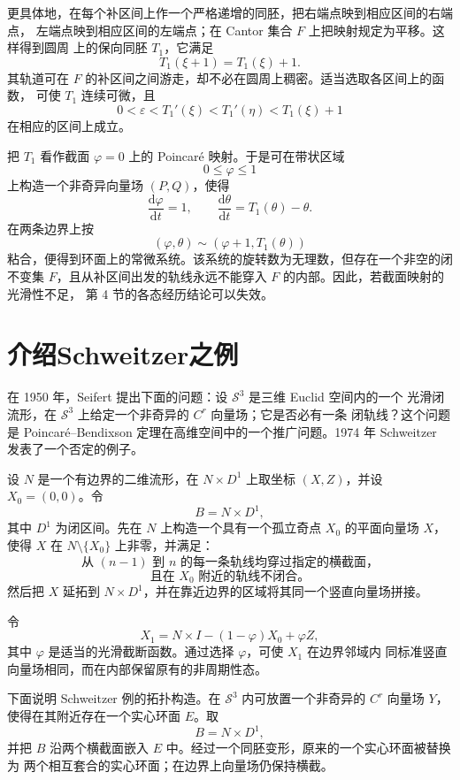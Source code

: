 更具体地，在每个补区间上作一个严格递增的同胚，把右端点映到相应区间的右端点，
左端点映到相应区间的左端点；在 Cantor 集合 $F$ 上把映射规定为平移。这样得到圆周
上的保向同胚 $T_1$，它满足
\[
  T_1(\xi+1)=T_1(\xi)+1.
\]
其轨道可在 $F$ 的补区间之间游走，却不必在圆周上稠密。适当选取各区间上的函数，
可使 $T_1$ 连续可微，且
\[
  0<\varepsilon<T_1'(\xi)<T_1'(\eta)<T_1(\xi)+1
\]
在相应的区间上成立。

把 $T_1$ 看作截面 $\varphi=0$ 上的 Poincar\'e 映射。于是可在带状区域
\[
  0\leq\varphi\leq1
\]
上构造一个非奇异向量场 $(P,Q)$，使得
\[
  \frac{\mathrm d\varphi}{\mathrm dt}=1,\qquad
  \frac{\mathrm d\theta}{\mathrm dt}=T_1(\theta)-\theta. \tag{5.2}
\]
在两条边界上按
\[
  (\varphi,\theta)\sim(\varphi+1,T_1(\theta))
\]
粘合，便得到环面上的常微系统。该系统的旋转数为无理数，但存在一个非空的闭不变集
$F$，且从补区间出发的轨线永远不能穿入 $F$ 的内部。因此，若截面映射的光滑性不足，
第 4 节的各态经历结论可以失效。

\section{介绍Schweitzer之例}

在 1950 年，Seifert 提出下面的问题：设 $\mathscr S^3$ 是三维 Euclid 空间内的一个
光滑闭流形，在 $\mathscr S^3$ 上给定一个非奇异的 $C^r$ 向量场；它是否必有一条
闭轨线？这个问题是 Poincar\'e--Bendixson 定理在高维空间中的一个推广问题。1974 年
Schweitzer 发表了一个否定的例子。

设 $N$ 是一个有边界的二维流形，在 $N\times D^1$ 上取坐标 $(X,Z)$，并设
$X_0=(0,0)$。令
\[
  B=N\times D^1,
\]
其中 $D^1$ 为闭区间。先在 $N$ 上构造一个具有一个孤立奇点 $X_0$ 的平面向量场 $X$，
使得 $X$ 在 $N\setminus\{X_0\}$ 上非零，并满足：
\[
  \text{从 }(n-1)\text{ 到 }n\text{ 的每一条轨线均穿过指定的横截面，}
\]
\[
  \text{且在 }X_0\text{ 附近的轨线不闭合。} \tag{6.1}
\]
然后把 $X$ 延拓到 $N\times D^1$，并在靠近边界的区域将其同一个竖直向量场拼接。

令
\[
  X_1=N\times I-(1-\varphi)X_0+\varphi Z,
\]
其中 $\varphi$ 是适当的光滑截断函数。通过选择 $\varphi$，可使 $X_1$ 在边界邻域内
同标准竖直向量场相同，而在内部保留原有的非周期性态。

下面说明 Schweitzer 例的拓扑构造。在 $\mathscr S^3$ 内可放置一个非奇异的
$C^r$ 向量场 $Y$，使得在其附近存在一个实心环面 $E$。取
\[
  B=N\times D^1,
\]
并把 $B$ 沿两个横截面嵌入 $E$ 中。经过一个同胚变形，原来的一个实心环面被替换为
两个相互套合的实心环面；在边界上向量场仍保持横截。

